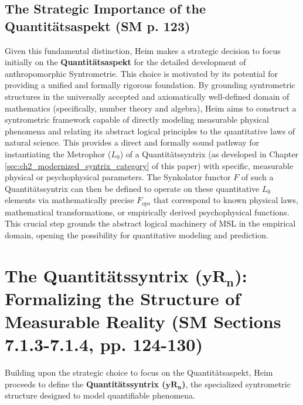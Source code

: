 \documentclass[
    12pt,              %
    a4paper,           %
    headings=normal,   %
    twoside=true,      %
    BCOR=8mm,          %
]{scrbook}
\newcommand{\quantitaetssyntrix}{\bm{yR_n}}
\begin{document}
\subsection{The Strategic Importance of the Quantitätsaspekt (SM p. 123)}
\label{sec:ch7_1_4_importance_quantitaspekt}
Given this fundamental distinction, Heim makes a strategic decision to focus initially on the \textbf{Quantitätsaspekt} for the detailed development of anthropomorphic Syntrometrie. This choice is motivated by its potential for providing a unified and formally rigorous foundation. By grounding syntrometric structures in the universally accepted and axiomatically well-defined domain of mathematics (specifically, number theory and algebra), Heim aims to construct a syntrometric framework capable of directly modeling measurable physical phenomena and relating its abstract logical principles to the quantitative laws of natural science.
This provides a direct and formally sound pathway for instantiating the Metrophor (\(L_0\)) of a Quantitätssyntrix (as developed in Chapter \ref{sec:ch2_modernized_syntrix_category} of this paper) with specific, measurable physical or psychophysical parameters. The Synkolator functor \(F\) of such a Quantitätssyntrix can then be defined to operate on these quantitative \(L_0\) elements via mathematically precise \(F_{ops}\) that correspond to known physical laws, mathematical transformations, or empirically derived psychophysical functions. This crucial step grounds the abstract logical machinery of MSL in the empirical domain, opening the possibility for quantitative modeling and prediction.

\section{\texorpdfstring{The Quantitätssyntrix (\(\quantitaetssyntrix\)): Formalizing the Structure of Measurable Reality (SM Sections 7.1.3-7.1.4, pp. 124-130)}{The Quantitatssyntrix: Formalizing the Structure of Measurable Reality (SM Sections 7.1.3-7.1.4, pp. 124-130)}}

\label{sec:ch7_2_quantitaetssyntrix}

Building upon the strategic choice to focus on the Quantitätsaspekt, Heim proceeds to define the \textbf{Quantitätssyntrix (\(\quantitaetssyntrix\))}, the specialized syntrometric structure designed to model quantifiable phenomena.
\end{document}
